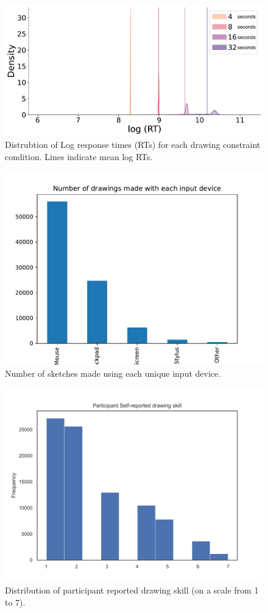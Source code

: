 \documentclass{article}
\begin{document}
\begin{figure}[ht!]
    \centering
    \includegraphics[width=.85\textwidth]{neurips_figures/neuripsdb_rt_by_abstraction.pdf}
    \caption{Distrubtion of Log response times (RTs) for each drawing constraint condition. Lines indicate mean log RTs. }
    \label{fig:rt_by_abstraction}
\end{figure}
\begin{figure}[ht!]
    \centering
    \includegraphics[width=.85\textwidth]{neurips_figures/neuripsdb_device_dist.pdf}
    \caption{Number of sketches made using each unique input device. }
    \label{fig:devices}
\end{figure}

\begin{figure}[ht!!]
    \centering
    \includegraphics[width=.85\textwidth]{neurips_figures/neuripsdb_skill_ratings.pdf}
    \caption{Distribution of participant reported drawing skill (on a scale from 1 to 7). }
    \label{fig:devices}
\end{figure}
\end{document}
